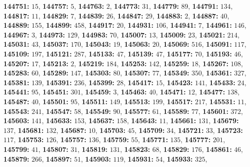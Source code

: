 \textsf{\bfseries 144751:} $15$, \textsf{\bfseries 144757:} $5$, \textsf{\bfseries 144763:} $2$, \textsf{\bfseries 144773:} $31$, \textsf{\bfseries 144779:} $89$, \textsf{\bfseries 144791:} $134$, \textsf{\bfseries 144817:} $11$, \textsf{\bfseries 144829:} $7$, \textsf{\bfseries 144839:} $26$, \textsf{\bfseries 144847:} $29$, \textsf{\bfseries 144883:} $2$, \textsf{\bfseries 144887:} $40$, \textsf{\bfseries 144889:} $155$, \textsf{\bfseries 144899:} $458$, \textsf{\bfseries 144917:} $20$, \textsf{\bfseries 144931:} $106$, \textsf{\bfseries 144941:} $7$, \textsf{\bfseries 144961:} $146$, \textsf{\bfseries 144967:} $3$, \textsf{\bfseries 144973:} $129$, \textsf{\bfseries 144983:} $70$, \textsf{\bfseries 145007:} $13$, \textsf{\bfseries 145009:} $23$, \textsf{\bfseries 145021:} $214$, \textsf{\bfseries 145031:} $43$, \textsf{\bfseries 145037:} $170$, \textsf{\bfseries 145043:} $19$, \textsf{\bfseries 145063:} $20$, \textsf{\bfseries 145069:} $516$, \textsf{\bfseries 145091:} $117$, \textsf{\bfseries 145109:} $197$, \textsf{\bfseries 145121:} $287$, \textsf{\bfseries 145133:} $47$, \textsf{\bfseries 145139:} $47$, \textsf{\bfseries 145177:} $70$, \textsf{\bfseries 145193:} $46$, \textsf{\bfseries 145207:} $17$, \textsf{\bfseries 145213:} $2$, \textsf{\bfseries 145219:} $184$, \textsf{\bfseries 145253:} $142$, \textsf{\bfseries 145259:} $18$, \textsf{\bfseries 145267:} $108$, \textsf{\bfseries 145283:} $60$, \textsf{\bfseries 145289:} $147$, \textsf{\bfseries 145303:} $80$, \textsf{\bfseries 145307:} $77$, \textsf{\bfseries 145349:} $350$, \textsf{\bfseries 145361:} $327$, \textsf{\bfseries 145381:} $139$, \textsf{\bfseries 145391:} $236$, \textsf{\bfseries 145399:} $28$, \textsf{\bfseries 145417:} $15$, \textsf{\bfseries 145423:} $141$, \textsf{\bfseries 145433:} $24$, \textsf{\bfseries 145441:} $95$, \textsf{\bfseries 145451:} $301$, \textsf{\bfseries 145459:} $3$, \textsf{\bfseries 145463:} $40$, \textsf{\bfseries 145471:} $12$, \textsf{\bfseries 145477:} $138$, \textsf{\bfseries 145487:} $40$, \textsf{\bfseries 145501:} $95$, \textsf{\bfseries 145511:} $149$, \textsf{\bfseries 145513:} $199$, \textsf{\bfseries 145517:} $217$, \textsf{\bfseries 145531:} $11$, \textsf{\bfseries 145543:} $241$, \textsf{\bfseries 145547:} $58$, \textsf{\bfseries 145549:} $90$, \textsf{\bfseries 145577:} $61$, \textsf{\bfseries 145589:} $77$, \textsf{\bfseries 145601:} $372$, \textsf{\bfseries 145603:} $141$, \textsf{\bfseries 145633:} $153$, \textsf{\bfseries 145637:} $158$, \textsf{\bfseries 145643:} $11$, \textsf{\bfseries 145661:} $131$, \textsf{\bfseries 145679:} $137$, \textsf{\bfseries 145681:} $132$, \textsf{\bfseries 145687:} $10$, \textsf{\bfseries 145703:} $45$, \textsf{\bfseries 145709:} $34$, \textsf{\bfseries 145721:} $33$, \textsf{\bfseries 145723:} $117$, \textsf{\bfseries 145753:} $126$, \textsf{\bfseries 145757:} $136$, \textsf{\bfseries 145759:} $55$, \textsf{\bfseries 145771:} $135$, \textsf{\bfseries 145777:} $201$, \textsf{\bfseries 145799:} $41$, \textsf{\bfseries 145807:} $31$, \textsf{\bfseries 145819:} $131$, \textsf{\bfseries 145823:} $68$, \textsf{\bfseries 145829:} $176$, \textsf{\bfseries 145861:} $46$, \textsf{\bfseries 145879:} $266$, \textsf{\bfseries 145897:} $51$, \textsf{\bfseries 145903:} $119$, \textsf{\bfseries 145931:} $54$, \textsf{\bfseries 145933:} $325$, 
